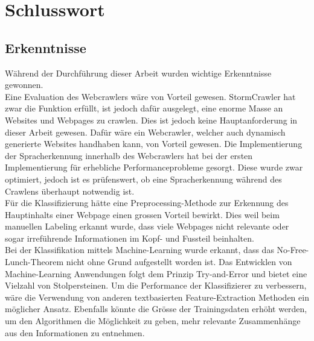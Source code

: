 \chapter{Schlusswort}
\section{Erkenntnisse}
Während der Durchführung dieser Arbeit wurden wichtige Erkenntnisse gewonnen.\\
Eine Evaluation des Webcrawlers wäre von Vorteil gewesen.
StormCrawler hat zwar die Funktion erfüllt, ist jedoch dafür ausgelegt, eine enorme Masse an Websites und Webpages zu crawlen.
Dies ist jedoch keine Hauptanforderung in dieser Arbeit gewesen.
Dafür wäre ein Webcrawler, welcher auch dynamisch generierte Websites handhaben kann, von Vorteil gewesen.
Die Implementierung der Spracherkennung innerhalb des Webcrawlers hat bei der ersten Implementierung für erhebliche Performanceprobleme gesorgt.
Diese wurde zwar optimiert, jedoch ist es prüfenswert, ob eine Spracherkennung während des Crawlens überhaupt notwendig ist.\\
Für die Klassifizierung hätte eine Preprocessing-Methode zur Erkennung des Hauptinhalts einer Webpage einen grossen Vorteil bewirkt.
Dies weil beim manuellen Labeling erkannt wurde, dass viele Webpages nicht relevante oder sogar irreführende Informationen im Kopf- und Fussteil beinhalten.\\
Bei der Klassifikation mittels Machine-Learning wurde erkannt, dass das \glqq No-Free-Lunch\grqq{}-Theorem nicht ohne Grund aufgestellt worden ist.
Das Entwicklen von Machine-Learning Anwendungen folgt dem Prinzip \glqq Try-and-Error\grqq{} und bietet eine Vielzahl von Stolpersteinen.
Um die Performance der Klassifizierer zu verbessern, wäre die Verwendung von anderen textbasierten Feature-Extraction Methoden ein möglicher Ansatz.
Ebenfalls könnte die Grösse der Trainingsdaten erhöht werden, um den Algorithmen die Möglichkeit zu geben, mehr relevante Zusammenhänge aus den Informationen zu entnehmen.
